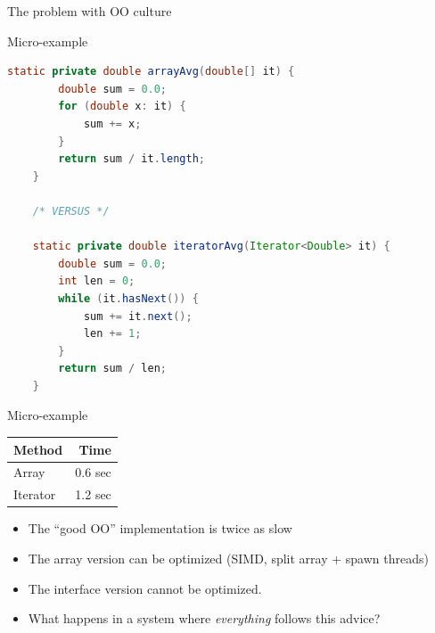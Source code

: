 \documentclass[10pt,xcolor=dvipsnames]{beamer}
\renewcommand\big[1]{
  \begin{center}
    \Large{#1}
  \end{center}
}
\begin{document}
\begin{frame}
  \big{The problem with OO culture}
\end{frame}


\begin{frame}[fragile]{Micro-example}
  \begin{lstlisting}[language=Java]
    static private double arrayAvg(double[] it) {
        double sum = 0.0;
        for (double x: it) {
            sum += x;
        }
        return sum / it.length;
    }

    /* VERSUS */

    static private double iteratorAvg(Iterator<Double> it) {
        double sum = 0.0;
        int len = 0;
        while (it.hasNext()) {
            sum += it.next();
            len += 1;
        }
        return sum / len;
    }
  \end{lstlisting}
\end{frame}

\begin{frame}[fragile]{Micro-example}
  \begin{center}
    \begin{tabular}{l | r}
      Method         & Time \\
      \hline
      Array          & 0.6 sec \\
      Iterator       & 1.2 sec
    \end{tabular}
  \end{center}
  \begin{itemize}
    \item The ``good OO'' implementation is twice as slow
    \item The array version can be optimized (SIMD, split array + spawn threads)
    \item The interface version cannot be optimized.
    \item What happens in a system where \emph{everything} follows this advice?
  \end{itemize}
\end{frame}
\end{document}
